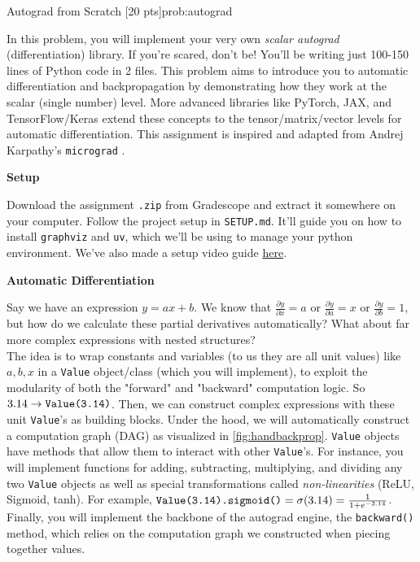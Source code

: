 \begin{problem}{Autograd from Scratch \hfill {[20 pts]}}{prob:autograd}
\label{prob:autograd}

In this problem, you will implement your very own \textit{scalar autograd}
(differentiation) library. If you're scared, don't be! You'll be writing just
100-150 lines of Python code in 2 files. This problem aims to introduce you to
automatic differentiation and backpropagation by demonstrating how they work at
the scalar (single number) level. More advanced libraries like PyTorch, JAX, and
TensorFlow/Keras extend these concepts to the tensor/matrix/vector levels for
automatic differentiation. This assignment is inspired and adapted from Andrej
Karpathy's \verb|micrograd| \cite{Andrej2024karpathy}.

\vspace{10px}
\textbf{Setup}

Download the assignment \verb|.zip| from Gradescope and extract it somewhere on
your computer. Follow the project setup in \verb|SETUP.md|. It'll guide you on
how to install \verb|graphviz| and \verb|uv|, which we'll be using to manage
your python environment. We've also made a setup video guide
\href{https://youtu.be/9R_9iv-Y4Ts}{here}.

\vspace{10px}
\textbf{Automatic Differentiation}

Say we have an expression $y = ax + b$. We know that $\frac{\partial y}{\partial
x} = a$ or $\frac{\partial{y}}{\partial a} = x$ or $\frac{\partial y}{\partial
b} = 1$, but how do we calculate these partial derivatives automatically? What
about far more complex expressions with nested structures?\\

The idea is to wrap constants and variables (to us they are all unit values)
like $a, b, x$ in a \verb|Value| object/class (which you will implement), to
exploit the modularity of both the "forward" and "backward" computation logic.
So $3.14 \rightarrow \verb|Value(3.14)|$. Then, we can construct complex
expressions with these unit \verb|Value|'s as building blocks. Under the hood,
we will automatically construct a computation graph (DAG) as visualized in
\cref{fig:handbackprop}. \verb|Value| objects have methods that allow them to
interact with other \verb|Value|'s. For instance, you will implement functions
for adding, subtracting, multiplying, and dividing any two \verb|Value| objects
as well as special transformations called \textit{non-linearities} (ReLU,
Sigmoid, tanh). For example, $\verb|Value(3.14).sigmoid()| = \sigma(3.14) =
\frac{1}{1 + e^{-3.14}}$. Finally, you will implement the backbone of the
autograd engine, the \verb|backward()| method, which relies on the computation
graph we constructed when piecing together values.\\


\end{problem}
